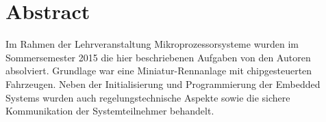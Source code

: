 \chapter*{Abstract}
Im Rahmen der Lehrveranstaltung Mikroprozessorsysteme wurden im 
Sommersemester 2015 die hier beschriebenen Aufgaben
von den Autoren absolviert. Grundlage war eine Miniatur-Rennanlage
mit chipgesteuerten Fahrzeugen. Neben der Initialisierung und Programmierung der 
Embedded Systems wurden auch regelungstechnische Aspekte
sowie die sichere Kommunikation der Systemteilnehmer behandelt.